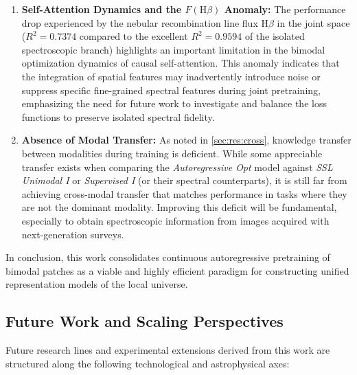\begin{enumerate}
	\item \textbf{Self-Attention Dynamics and the $F(\text{H}\beta)$ Anomaly:} 
	The performance drop experienced by the nebular recombination line flux $\text{H}\beta$ in the joint space ($R^2 = 0.7374$ compared to the excellent $R^2 = 0.9594$ of the isolated spectroscopic branch) highlights an important limitation in the bimodal optimization dynamics of causal self-attention. This anomaly indicates that the integration of spatial features may inadvertently introduce noise or suppress specific fine-grained spectral features during joint pretraining, emphasizing the need for future work to investigate and balance the loss functions to preserve isolated spectral fidelity.
	\item \textbf{Absence of Modal Transfer:} As noted in \cref{sec:res:cross}, knowledge transfer between modalities during training is deficient. While some appreciable transfer exists when comparing the \textit{Autoregressive Opt} model against \textit{SSL Unimodal I} or \textit{Supervised I} (or their spectral counterparts), it is still far from achieving cross-modal transfer that matches performance in tasks where they are not the dominant modality. Improving this deficit will be fundamental, especially to obtain spectroscopic information from images acquired with next-generation surveys.
\end{enumerate}

In conclusion, this work consolidates continuous autoregressive pretraining of bimodal patches as a viable and highly efficient paradigm for constructing unified representation models of the local universe.

\subsection{Future Work and Scaling Perspectives} \label{sec:concl:future}

Future research lines and experimental extensions derived from this work are structured along the following technological and astrophysical axes:

